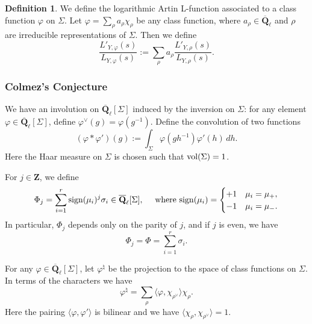 \documentclass[reqno]{amsart}
\numberwithin{equation}{subsection}
\theoremstyle{definition}
\newtheorem{defn}[subsubsection]{Definition}
\newcommand\Sht{\textup{Sht}}
\newcommand{\vol}{\textup{vol}}
\newcommand{\Qlbar}{\overline{\Q}_\ell}
\newcommand{\cohog}[2]{\textup{H}^{#1}({#2})}     %
\newcommand{\s}{\sigma}
\newcommand{\Sig}{\Sigma}
\newcommand{\Z}{\mathbf{Z}}
\newcommand{\Q}{\mathbf{Q}}
\newcommand{\ul}[1]{\underline{#1}}
\begin{document}

\begin{defn}
We define the logarithmic Artin L-function associated to a class function $\varphi$ on $\Sigma$. Let $\varphi =\sum_\rho a_\rho \chi_\rho$ be any class function, where $a_\rho\in\Qlbar$ and $\rho$ are irreducible representations of $\Sig$. Then we define
$$\frac{L'_{Y, \varphi}(s)}{L_{Y, \varphi}(s)}:=\sum_{\rho} a_\rho \frac{L'_{Y, \rho}(s)}{L_{Y, \rho}(s)}.
$$
\end{defn}

\subsubsection{Colmez's Conjecture} We have an involution on $\Qlbar[\Sig]$ induced by the inversion on $\Sigma$: for any element $\varphi \in\Qlbar[\Sig]$, define  $\varphi ^\vee(g)= \varphi (g^{-1}).$
Define the convolution of two functions
$$
(\varphi\ast \varphi')(g):=\int_{\Sig} \varphi(gh^{-1})\varphi'(h)\,dh.
$$
Here the Haar measure on $\Sig$ is chosen such that $\vol(\Sig)=1$. 


For $j\in\Z$, we define 
$$
\Phi_{j}=\sum_{i=1}^r {\rm sign}(\mu_i)^j \s_i\in\Qlbar[\Sig], \quad \text{ where } {\rm sign}(\mu_i) = \begin{cases} +1 & \mu_i = \mu_+, \\ -1 & \mu_i = \mu_-. \end{cases}
$$ 
In particular, $\Phi_{j}$ depends only on the parity of $j$, and if $j$ is even, we have 
$$
\Phi_{j}=\Phi=\sum_{i=1}^r  \s_i.
$$



For any $\varphi\in \Qlbar[\Sig]$, let $\varphi^\natural$ 
be the projection to the space of class functions on $\Sig$. In terms of the characters we have 
$$
\varphi^\natural=\sum_\rho \langle\varphi,\chi_{\rho^\vee} \rangle\chi_\rho.
$$ 
Here the pairing $\langle\varphi,\varphi' \rangle$ is bilinear and we have $\langle\chi_{\rho},\chi_{\rho^\vee} \rangle=1$.
\end{document}
